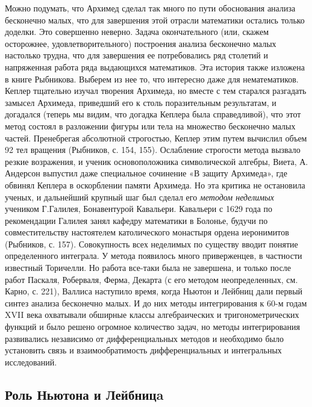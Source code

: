 Можно  подумать, что  Архимед  сделал так  много  по пути  обоснования
анализа бесконечно  малых, что для завершения  этой отрасли математики
остались только доделки. Это совершенно неверно. Задача окончательного
(или,  скажем  осторожнее,   удовлетворительного)  построения  анализа
бесконечно малых настолько трудна, что для завершения ее потребовались
ряд  столетий и  напряженная работа  ряда выдающихся  математиков. Эта
история  также изложена  в книге  Рыбникова.  Выберем из  нее то,  что
интересно  даже для  нематематиков. Кеплер  тщательно изучал  творения
Архимеда,  но  вместе  с  тем  старался  разгадать  замысел  Архимеда,
приведший  его   к  столь   поразительным  результатам,   и  догадался
(теперь  мы  видим,  что   догадка  Кеплера  была  справедливой),  что
этот  метод  состоял  в  разложении   фигуры  или  тела  на  множество
бесконечно  малых частей.  Пренебрегая  абсолютной строгостью,  Кеплер
этим  путем  вычислил  объем  92   тел  вращения  (Рыбников,  с.  154,
155).  Ослабление  строгости  метода   вызвало  резкие  возражения,  и
ученик  основоположника  символической  алгебры,  Виета,  А.  Андерсон
выпустил даже  специальное сочинение «В защиту  Архимеда», где обвинял
Кеплера в  оскорблении памяти Архимеда.  Но эта критика  не остановила
ученых,  и  дальнейший  крупный   шаг  был  сделал  его  \emph{методом
неделимых}  учеником  Г.Галилея,   Бонавентурой  Кавальери.  Кавальери
с  1629   года  по  рекомендации  Галилея   занял  кафедру  математики
в  Болонье,  будучи   по  совместительству  настоятелем  католического
монастыря  ордена иеронимитов  (Рыбников, с.  157). Совокупность  всех
неделимых по существу вводит понятие определенного интеграла. У метода
появилось  много приверженцев,  в  частности  известный Торичелли.  Но
работа  все-таки была  не  завершена, и  только  после работ  Паскаля,
Роберваля, Ферма, Декарта (с его методом неопределенных, см. Карно, с.
221),  Валлиса наступило  время, когда  Ньютон и  Лейбниц дали  первый
синтез  анализа бесконечно  малых. И  до них  методы интегрирования  к
60-м  годам  XVII века  охватывали  обширные  классы алгебраических  и
тригонометрических функций  и было  решено огромное  количество задач,
но  методы интегрирования  развивались независимо  от дифференциальных
методов  и  необходимо  было   установить  связь  и  взаимообратимость
дифференциальных и интегральных исследований.

\subsection{Роль Ньютона и Лейбницa}

